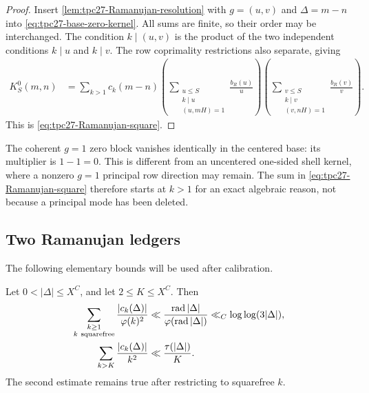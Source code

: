 \begin{proof}
Insert \cref{lem:tpc27-Ramanujan-resolution} with
\(g=(u,v)\) and \(\Delta=m-n\) into
\eqref{eq:tpc27-base-zero-kernel}.  All sums are finite, so their order
may be interchanged.  The condition \(k\mid(u,v)\) is the product of
the two independent conditions \(k\mid u\) and \(k\mid v\).  The row
coprimality restrictions also separate, giving
\begin{align*}
 K_S^0(m,n)
 &=\sum_{k>1}c_k(m-n)
 \left(
  \sum_{\substack{u\le S\\k\mid u\\(u,mH)=1}}
  \frac{b_R(u)}u
 \right)
 \left(
  \sum_{\substack{v\le S\\k\mid v\\(v,nH)=1}}
  \frac{b_R(v)}v
 \right).
\end{align*}
This is \eqref{eq:tpc27-Ramanujan-square}.
\end{proof}

\begin{remark}
\label{rem:tpc27-g1-removal}
The coherent \(g=1\) zero block vanishes identically in the centered
base: its multiplier is \(1-1=0\).  This is different from an
uncentered one-sided shell kernel, where a nonzero \(g=1\) principal
row direction may remain.  The sum in
\eqref{eq:tpc27-Ramanujan-square} therefore starts at \(k>1\) for an
exact algebraic reason, not because a principal mode has been deleted.
\end{remark}

\subsection{Two Ramanujan ledgers}

The following elementary bounds will be used after calibration.

\begin{lemma}
\label{lem:tpc27-Ramanujan-ledgers}
Let \(0<|\Delta|\le X^C\), and let \(2\le K\le X^C\).  Then
\begin{align}
 \sum_{\substack{k\ge1\\k\ \mathrm{squarefree}}}
 \frac{|c_k(\Delta)|}{\varphi(k)^2}
 &\ll
 \frac{\operatorname{rad}|\Delta|}{\varphi(\operatorname{rad}|\Delta|)}
 \ll_C\log\log(3|\Delta|),
 \label{eq:tpc27-small-Ramanujan-ledger}\\
 \sum_{k>K}\frac{|c_k(\Delta)|}{k^2}
 &\ll \frac{\tau(|\Delta|)}K.
 \label{eq:tpc27-large-Ramanujan-ledger}
\end{align}
The second estimate remains true after restricting to squarefree
\(k\).
\end{lemma}

